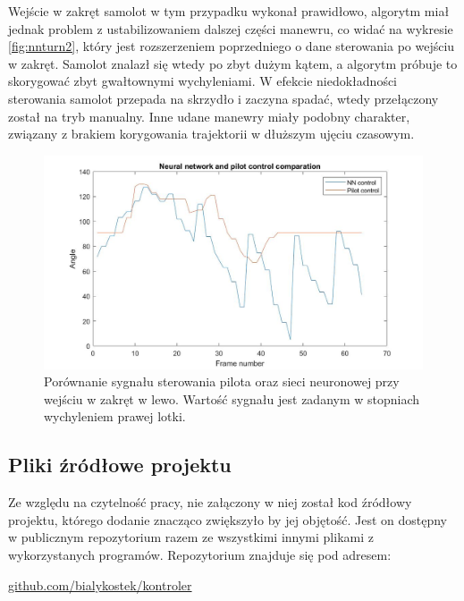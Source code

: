 \documentclass[12pt, a4paper]{article}
\begin{document}
Wejście w zakręt samolot w tym przypadku wykonał prawidłowo, algorytm miał jednak problem z ustabilizowaniem dalszej części manewru, co widać na wykresie \ref{fig:nnturn2}, który jest rozszerzeniem poprzedniego o dane sterowania po wejściu w zakręt. Samolot znalazł się wtedy po zbyt dużym kątem, a algorytm próbuje to skorygować zbyt gwałtownymi wychyleniami. W efekcie niedokładności sterowania samolot przepada na skrzydło i zaczyna spadać, wtedy przełączony został na tryb manualny. Inne udane manewry miały podobny charakter, związany z brakiem korygowania trajektorii w dłuższym ujęciu czasowym.



 \begin{figure}[H]
    \centering
    \includegraphics[width=1\textwidth]{nnturn2}
    \caption{Porównanie sygnału sterowania pilota oraz sieci neuronowej przy wejściu w zakręt w lewo. Wartość sygnału jest zadanym w stopniach wychyleniem prawej lotki.}
    \label{fig:nnturn}
\end{figure}
\FloatBarrier



\subsection{Pliki źródłowe projektu}
Ze względu na czytelność pracy, nie załączony w niej został kod źródłowy projektu, którego dodanie znacząco zwiększyło by jej objętość. Jest on dostępny w publicznym repozytorium razem ze wszystkimi innymi plikami z wykorzystanych programów. Repozytorium znajduje się pod adresem:

\begin{center}
\url{github.com/bialykostek/kontroler}
\end{center}
\end{document}
